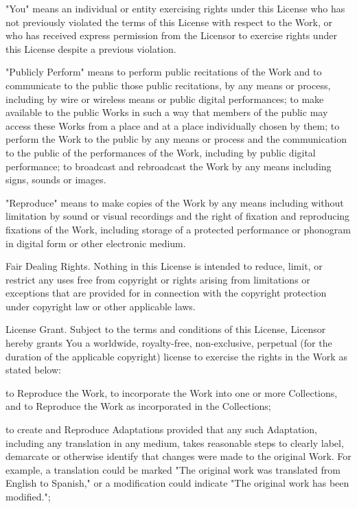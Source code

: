 \item
    "You" means an individual or entity exercising rights under this
    License who has not previously violated the terms of this License with
    respect to the Work, or who has received express permission from the
    Licensor to exercise rights under this License despite a previous
    violation.

\item
    "Publicly Perform" means to perform public recitations of the Work and
    to communicate to the public those public recitations, by any means or
    process, including by wire or wireless means or public digital
    performances; to make available to the public Works in such a way that
    members of the public may access these Works from a place and at a
    place individually chosen by them; to perform the Work to the public
    by any means or process and the communication to the public of the
    performances of the Work, including by public digital performance; to
    broadcast and rebroadcast the Work by any means including signs,
    sounds or images.

\item
    "Reproduce" means to make copies of the Work by any means including
    without limitation by sound or visual recordings and the right of
    fixation and reproducing fixations of the Work, including storage of a
    protected performance or phonogram in digital form or other electronic
    medium.
\stopitemize

\item
Fair Dealing Rights. Nothing in this License is intended to reduce,
limit, or restrict any uses free from copyright or rights arising from
limitations or exceptions that are provided for in connection with the
copyright protection under copyright law or other applicable laws.

\item
License Grant. Subject to the terms and conditions of this License,
Licensor hereby grants You a worldwide, royalty-free, non-exclusive,
perpetual (for the duration of the applicable copyright) license to
exercise the rights in the Work as stated below:

\startitemize[a]
\item
    to Reproduce the Work, to incorporate the Work into one or more
    Collections, and to Reproduce the Work as incorporated in the
    Collections;

\item
    to create and Reproduce Adaptations provided that any such Adaptation,
    including any translation in any medium, takes reasonable steps to
    clearly label, demarcate or otherwise identify that changes were made
    to the original Work. For example, a translation could be marked "The
    original work was translated from English to Spanish," or a
    modification could indicate "The original work has been modified.";

